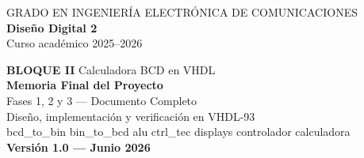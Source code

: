 \documentclass[10pt, a4paper]{article}
\begin{document}
\begin{titlepage}
  \thispagestyle{empty}

  \vspace*{-1cm}
  \begin{flushleft}
    {\fontsize{9}{12}\selectfont\color{white!80}
      GRADO EN INGENIERÍA ELECTRÓNICA DE COMUNICACIONES}\\[1ex]
    {\fontsize{24}{28}\selectfont\bfseries\color{white}
      Diseño Digital 2}\\[1ex]
    {\fontsize{11}{14}\selectfont\color{white!80}
      Curso académico 2025--2026}
  \end{flushleft}

  \vspace*{0.11\paperheight}
  \begin{center}
    {\Large\color{MainBlue!80}\textbf{BLOQUE II}
      \quad\textbullet\quad Calculadora BCD en VHDL}\\[0.8cm]

    {\fontsize{30}{38}\selectfont\bfseries\color{MainBlue}
      Memoria Final del Proyecto}\\[0.5cm]

    {\fontsize{14}{20}\selectfont\color{MainBlue!80}
      Fases 1, 2 y 3 --- Documento Completo}\\[0.4cm]

    {\fontsize{12}{18}\selectfont\color{black!60}
      Diseño, implementación y verificación en VHDL-93}\\[0.2cm]
    {\fontsize{11}{14}\selectfont\ttfamily\color{black!50}
      bcd\_to\_bin \quad bin\_to\_bcd \quad alu \quad ctrl\_tec
      \quad displays \quad controlador \quad calculadora}\\[0.5cm]

    {\fontsize{11}{14}\selectfont\bfseries\color{MainBlue}
      Versión 1.0 --- Junio 2026}


\end{center}
\end{titlepage}
\end{document}
